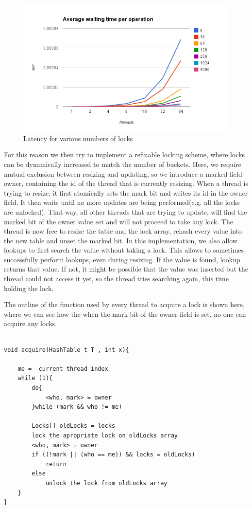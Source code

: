 \begin{figure}
 \centering
  \includegraphics[scale=0.7]{hashes_striped_latency.png}
\caption{Latency for various numbers of locks}
\label{hashes_striped_latency}
\end{figure}
For this reason we then try to implement a refinable locking scheme, where locks can be dynamically increased to match the number of buckets. Here, we require mutual exclusion between resizing and updating, so we introduce a marked field owner, containing the id of the thread that is currently resizing. When a thread is trying to resize, it first atomically sets the mark bit and writes its id in the owner field. It then waits until no more updates are being performed(e.g. all the locks are unlocked). That way, all other threads that are trying to update, will find the marked bit of the owner value set and will not proceed to take any lock. The thread is now free to resize the table and the lock array, rehash every value into the new table and unset the marked bit. In this implementation, we also allow lookups to first search the value without taking a lock. This allows to sometimes successfully perform lookups, even during resizing. If the value is found, lookup returns that value. If not, it might be possible that the value was inserted but the thread could not access it yet, so the thread tries searching again, this time holding the lock. 

The outline of the function used by every thread to acquire a lock is shown here, where we can see how the when the mark bit of the owner field is set, no one can acquire any locks.

\begin{lstlisting}

void acquire(HashTable_t T , int x){
	
	me =  current thread index
	while (1){
		do{
			<who, mark> = owner
		}while (mark && who != me)
		
		Locks[] oldLocks = locks
		lock the apropriate lock on oldLocks array
		<who, mark> = owner
		if ((!mark || (who == me)) && locks = oldLocks)
			return
		else 
			unlock the lock from oldLocks array 
	}
}

\end{lstlisting}

